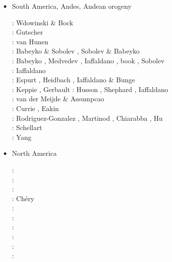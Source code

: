 \begin{itemize}
\item South America, Andes, Andean orogeny 

\begin{scriptsize}
\nineteenninetyfour: Wdowinski \& Bock \cite{wdbo94b}\\
\twothousand: Gutscher \etal \cite{gusb00}\\
\twothousandtwo: van Hunen \etal \cite{vavv02b}\\
\twothousandfive: Babeyko \& Sobolev \cite{baso05}, Sobolev \& Babeyko \cite{soba05}\\
\twothousandsix: Babeyko \etal \cite{basv06}, Medvedev \etal \cite{meph06},
                 Iaffaldano \etal \cite{iabd06}, book \cite{oncf06}, Sobolev \etal \cite{sobk06}\\
\twothousandseven: Iaffaldano \etal \cite{iabb07}\\
\twothousandeight: Espurt \etal \cite{esfm08}, Heidbach \etal \cite{heib08}, 
                   Iaffaldano \& Bunge \cite{iabu08}\\
\twothousandnine: Keppie \etal \cite{kecw09}, Gerbault \etal \cite{gecm09}
\twothousandtwelve: Husson \etal \cite{hucf12}, Shephard \etal \cite{shlm12},
                    Iaffaldano \cite{iadc12}\\
\twothousandthirteen: van der Meijde \& Assumpcao \cite{waja13}\\
\twothousandfifteen: Currie \etal \cite{cudd15}, Eakin \etal \cite{ealw15}\\
\twothousandsixteen: Rodriguez-Gonzalez \etal \cite{robn16}, Martinod \etal \cite{marl16}, 
                     Chiarabba \etal \cite{chdf16}, Hu \etal \cite{hulh16}\\
\twothousandseventeen: Schellart \cite{sche17}\\
\twothousandnineteen: Yang \etal \cite{yamg19}
\end{scriptsize}

\item North America 

\begin{scriptsize}
\nineteenseventythree: \cite{sabu73}\\
\nineteenninety: \cite{huha90}\\
\nineteenninetyseven: \cite{bugm97}\\
\twothousandone: Ch\'ery \etal \cite{chzh01} \\
\twothousandsix: \cite{besb06}\\
\twothousandeight: \cite{splg08}\\
\twothousandnine: \cite{splg09}\\
\twothousandtwelve: \cite{beck12}\\
\twothousandthirteen: \cite{ghbh13}\cite{simi13}\\
\twothousandfifteen: \cite{riag15}
\end{scriptsize}


\end{itemize}
